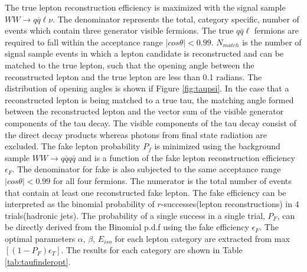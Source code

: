 The true lepton reconstruction efficiency is maximized with the signal sample $WW\rightarrow q\bar{q}\ell\nu$. The denominator represents the total, category specific, number of events which contain three generator visible fermions. The true $q\bar{q}\ell$ fermions are required to fall within the acceptance range $|cos\theta| < 0.99$. $N_{match}$ is the number of signal sample events in which a lepton candidate is reconstructed and can be matched to the true lepton, such that the opening angle between the reconstructed lepton and the true lepton are less than 0.1 radians. The distribution of opening angles is shown if Figure \ref{fig:taupsi}. In the case that a reconstructed lepton is being matched to a true tau, the matching angle formed between the reconstructed lepton and the vector sum of the visible generator components of the tau decay. The visible components of the tau decay consist of the direct decay products whereas photons from final state radiation are excluded. The fake lepton probability $P_f$ is minimized using the background sample $WW\rightarrow q\bar{q}q\bar{q}$ and is a function of the fake lepton reconstruction efficiency $\epsilon_F$. The denominator for fake is also subjected to the same acceptance range $|cos\theta| < 0.99$ for all four fermions. The numerator is the total number of events  that contain at least one reconstructed fake lepton. The fake efficiency can be interpreted as the binomial probability of $r$-successes(lepton reconstructions) in 4 trials(hadronic jets). The probability of a single success in a single trial, $P_F$, can be directly derived from the Binomial p.d.f using the fake efficiency $\epsilon_F$. The optimal parameters $\alpha$, $\beta$, $E_{iso}$ for each lepton category are extracted from max$[(1-P_F)\epsilon_T]$. The results for each category are shown in Table \ref{tab:taufinderopt}. 


